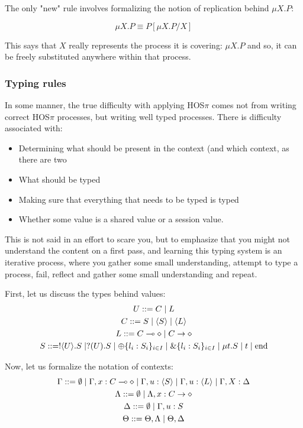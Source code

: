 The only "new" rule involves formalizing the notion of replication behind $\mu X . P$:

$$
\mu X . P \equiv P [\mu X . P/ X]
$$

This says that $X$ really represents the process it is covering: $\mu X . P$ and so, it can be freely substituted anywhere within that process.

\subsubsection{Typing rules}

In some manner, the true difficulty with applying HOS$\pi$ comes not from writing correct HOS$\pi$ processes, but writing well typed processes. There is difficulty associated with:
\begin{itemize}
\item Determining what should be present in the context (and which context, as there are two
\item What should be typed
\item Making sure that everything that needs to be typed is typed
\item Whether some value is a shared value or a session value.
\end{itemize}

This is not said in an effort to scare you, but to emphasize that you might not understand the content on a first pass, and learning this typing system is an iterative process, where you gather some small understanding, attempt to type a process, fail, reflect and gather some small understanding and repeat.

First, let us discuss the types behind values:
\begin{gather*}
U ::= C \mid L \\
C ::= S \mid \langle S \rangle \mid \langle L \rangle \\
L ::= C \multimap \diamond \mid C \rightarrow \diamond \\
S ::= !\langle U \rangle . S \mid ?(U).S \mid \oplus \{l_i : S_i\}_{i \in I} \mid \&\{l_i : S_i\}_{i \in I} \mid \mu t. S \mid t \mid \text{end}
\end{gather*}

Now, let us formalize the notation of contexts:
\begin{gather*}
\Gamma ::= \emptyset \mid \Gamma, x : C \multimap \diamond \mid \Gamma, u : \langle S \rangle \mid \Gamma, u : \langle L \rangle \mid \Gamma, X : \Delta \\
\Lambda ::= \emptyset \mid \Lambda, x : C \rightarrow \diamond \\
\Delta ::= \emptyset \mid \Gamma, u : S \\
\Theta ::= \Theta,\Lambda \mid \Theta,\Delta
\end{gather*}

